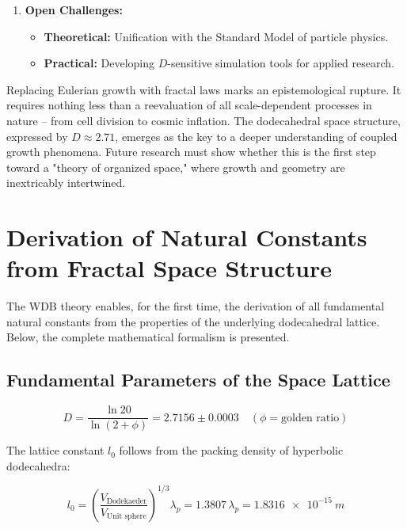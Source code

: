\begin{enumerate}
    \item \textbf{Open Challenges:}  
    \begin{itemize}  
        \item \textbf{Theoretical:} Unification with the Standard Model of particle physics.  
        \item \textbf{Practical:} Developing $D$-sensitive simulation tools for applied research.  
    \end{itemize}  
\end{enumerate}  
Replacing Eulerian growth with fractal laws marks an epistemological rupture. It requires nothing less than a reevaluation of all scale-dependent  
processes in nature – from cell division to cosmic inflation. The dodecahedral space structure, expressed by $D \approx 2.71$, emerges as the key to  
a deeper understanding of coupled growth phenomena. Future research must show whether this is the first step toward a "theory of organized space," where  
growth and geometry are inextricably intertwined.  

\section{Derivation of Natural Constants from Fractal Space Structure}  
\label{sec:naturkonstanten}  

The WDB theory enables, for the first time, the derivation of all fundamental natural constants from the properties of the underlying dodecahedral lattice. Below, the complete mathematical formalism is presented.  

\subsection{Fundamental Parameters of the Space Lattice}  

\begin{equation}  
D = \frac{\ln 20}{\ln(2 + \phi)} = 2.7156 \pm 0.0003 \quad (\phi = \text{golden ratio})  
\label{eq:fraktaldimension}  
\end{equation}  

The lattice constant $l_0$ follows from the packing density of hyperbolic dodecahedra:  

\begin{equation}  
l_0 = \left(\frac{V_{\text{Dodekaeder}}}{V_{\text{Unit sphere}}}\right)^{1/3} \lambda_p = 1.3807\,\lambda_p = \SI{1.8316e-15}{m}  
\label{eq:gitterkonstante}  
\end{equation}  

